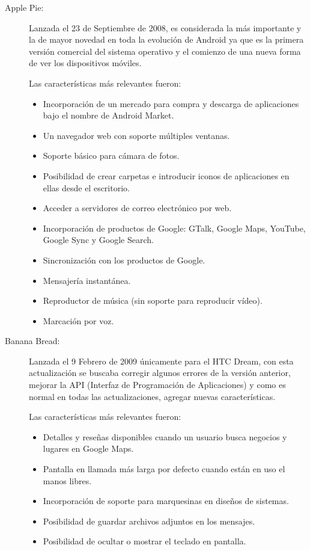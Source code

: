\begin{description}
	\item[Apple Pie:]
		Lanzada el 23 de Septiembre de 2008, es considerada la más importante y la de mayor novedad en toda la evolución de Android ya que es la primera versión comercial del 
		sistema operativo y el comienzo de una nueva forma de ver los dispositivos móviles.
		
		Las características más relevantes fueron:
		\begin{itemize}
			\item Incorporación de un mercado para compra y descarga de aplicaciones bajo el nombre de Android Market.
			\item Un navegador web con soporte múltiples ventanas.
			\item Soporte básico para cámara de fotos.
			\item Posibilidad de crear carpetas e introducir iconos de aplicaciones en ellas desde el escritorio.
			\item Acceder a servidores de correo electrónico por web.
			\item Incorporación de productos de Google: GTalk, Google Maps, YouTube, Google Sync y Google Search.
			\item Sincronización con los productos de Google.
			\item Mensajería instantánea.
			\item Reproductor de música (sin soporte para reproducir vídeo).
			\item Marcación por voz.
		\end{itemize}
	
	\item[Banana Bread:]
		Lanzada el 9 Febrero de 2009 únicamente para el HTC Dream, con esta actualización se buscaba corregir algunos errores de la versión anterior, mejorar la API (Interfaz de 
		Programación de Aplicaciones) y como es normal en todas las actualizaciones, agregar nuevas características.
		
		Las características más relevantes fueron:
		\begin{itemize}
			\item Detalles y reseñas disponibles cuando un usuario busca negocios y lugares en Google Maps.
			\item Pantalla en llamada más larga por defecto cuando están en uso el manos libres.
			\item Incorporación de soporte para marquesinas en diseños de sistemas.
			\item Posibilidad de guardar archivos adjuntos en los mensajes.
			\item Posibilidad de ocultar o mostrar el teclado en pantalla.
		\end{itemize}
	

\end{description}

